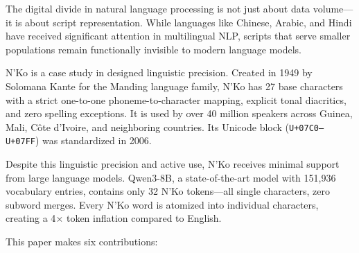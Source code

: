 \documentclass[11pt]{article}
\begin{document}
The digital divide in natural language processing is not just about data volume---it is about script representation.
While languages like Chinese, Arabic, and Hindi have received significant attention in multilingual NLP, scripts that serve smaller populations remain functionally invisible to modern language models.

N'Ko is a case study in designed linguistic precision.
Created in 1949 by Solomana Kante for the Manding language family, N'Ko has 27 base characters with a strict one-to-one phoneme-to-character mapping, explicit tonal diacritics, and zero spelling exceptions.
It is used by over 40 million speakers across Guinea, Mali, C\^{o}te d'Ivoire, and neighboring countries.
Its Unicode block (\texttt{U+07C0--U+07FF}) was standardized in 2006.

Despite this linguistic precision and active use, N'Ko receives minimal support from large language models.
Qwen3-8B, a state-of-the-art model with 151,936 vocabulary entries, contains only 32 N'Ko tokens---all single characters, zero subword merges.
Every N'Ko word is atomized into individual characters, creating a 4$\times$ token inflation compared to English.

This paper makes six contributions:
\end{document}
